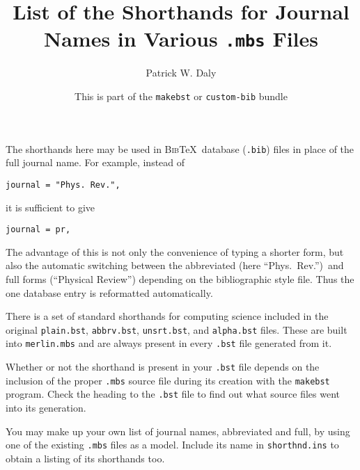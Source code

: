 \documentclass{article}
\begin{document}
\title
  {List of the Shorthands for Journal Names in Various \texttt{.mbs} Files}

\author{Patrick W. Daly}

\date{This is part of the \texttt{makebst} or \texttt{custom-bib} bundle}

\maketitle

\newcommand{\btx}{\textsc{Bib}\TeX}

The shorthands here may be used in \btx\ database (\texttt{.bib}) files in
place of the full journal name. For example, instead of
\begin{verbatim}
journal = "Phys. Rev.",
\end{verbatim}
it is sufficient to give
\begin{verbatim}
journal = pr,
\end{verbatim}
The advantage of this is not only the convenience of typing a shorter form,
but also the automatic switching between the abbreviated (here ``Phys.\
Rev.'')\ and full forms (``Physical Review'') depending on the bibliographic
style file. Thus the one database entry is reformatted automatically.

There is a set of standard shorthands for computing science included in the
original \texttt{plain.bst}, \texttt{abbrv.bst}, \texttt{unsrt.bst}, and
\texttt{alpha.bst} files. These are built into \texttt{merlin.mbs} and are
always present in every \texttt{.bst} file generated from it.

Whether or not the shorthand is present in your \texttt{.bst} file depends on
the inclusion of the proper \texttt{.mbs} source file during its creation with
the \texttt{makebst} program. Check the heading to the \texttt{.bst} file
to find out what source files went into its generation.

You may make up your own list of journal names, abbreviated and full, by using
one of the existing \texttt{.mbs} files as a model. Include its name in
\texttt{shorthnd.ins} to obtain a listing of its shorthands too.

\newpage
\end{document}
